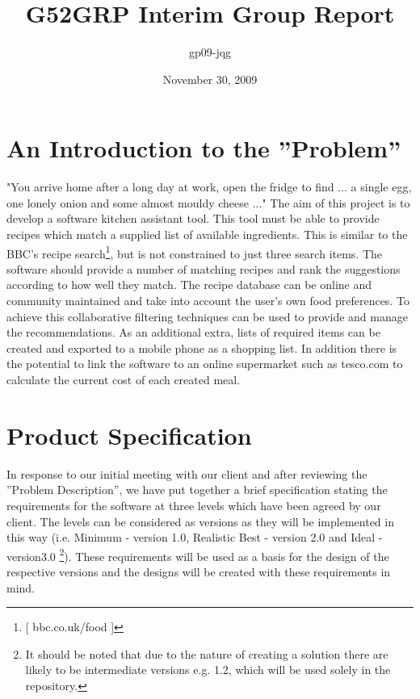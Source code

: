 \documentclass[12pt]{article}
\title{G52GRP Interim Group Report}                     %
\author{gp09-jqg}          %
\date{November 30, 2009}                                    %
\begin{document}
\maketitle                                              %

\section{An Introduction to the ''Problem''}
"You arrive home after a long day at work, open the fridge to find ... a single egg, one lonely onion and some almost mouldy cheese ..." The aim of this project is to develop a software kitchen assistant tool. This tool must be able to provide recipes which match a supplied list of available ingredients. This is similar to the BBC's recipe search\footnote{[ bbc.co.uk/food ]}, but is not constrained to just three search items. The software should provide a number of matching recipes and rank the suggestions according to how well they match. The recipe database can be online and community maintained and take into account the user's own food preferences. To achieve this collaborative filtering techniques can be used to provide and manage the recommendations. As an additional extra, lists of required items can be created and exported to a mobile phone as a shopping list. In addition there is the potential to link the software to an online supermarket such as tesco.com to calculate the current cost of each created meal. 
\newpage
\section{Product Specification} 			%
In response to our initial meeting with our client and after reviewing the ''Problem Description'', we have put together a brief specification stating the requirements for the software at three levels which have been agreed by our client. The levels can be considered as versions as they will be implemented in this way (i.e. Minimum - version 1.0, Realistic Best -  version 2.0 and Ideal - version3.0 \footnote{It should be noted that due to the nature of creating a solution there are likely to be intermediate versions e.g. 1.2, which will be used solely in the repository.}). These requirements will be used as a basis for the design of the respective versions and the designs will be created with these requirements in mind.
\end{document}
